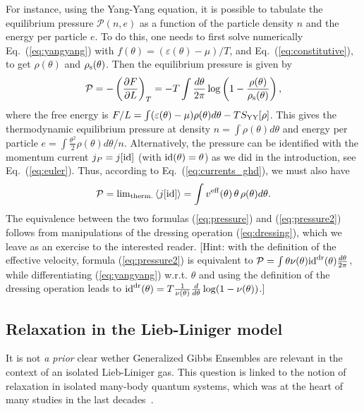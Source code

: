 \documentclass[onecolumn,amsfonts,showpacs,superscriptaddress]{revtex4-1}
\begin{document}
For instance, using the Yang-Yang equation, it is possible to tabulate the equilibrium pressure $\mathcal{P}(n,e)$ as a function of the particle density $n$ and the energy per particle $e$. To do this, one needs to first solve numerically Eq.~(\ref{eq:yangyang}) with $f(\theta) =  (\varepsilon(\theta)-\mu )/T$, and Eq.~(\ref{eq:constitutive}), to get $\rho(\theta)$ and $\rho_{\rm s}(\theta)$. Then the equilibrium pressure is given by \citep{yang1969thermodynamics,korepin1997quantum}
\begin{equation}
    \label{eq:pressure}
        \mathcal{P} = - \left( \frac{\partial F}{\partial L} \right)_T = - T \int \frac{d \theta}{2\pi} \log \left( 1 - \frac{\rho(\theta)}{\rho_{\rm s}(\theta)} \right) ,
\end{equation}
where the free energy is $F/L =  \int (\varepsilon(\theta) - \mu) \rho(\theta) d \theta - T S_{\rm YY} [\rho] $. This gives the thermodynamic equilibrium pressure at density $n = \int \rho(\theta) d\theta$ and energy per particle $e = \int \frac{\theta^2}{2} \rho(\theta) d\theta/n$. Alternatively, the pressure can be identified with the momentum current $j_P = j[{\rm id}]$ (with ${\rm id}(\theta) = \theta$) as we did in the introduction, see Eq.~(\ref{eq:euler}). Thus, according to Eq.~(\ref{eq:currents_ghd}), we must also have
\begin{equation}
    \label{eq:pressure2}
        \mathcal{P} = {\rm lim}_{\rm therm.} \left< j[{\rm id}] \right> = \int  v^{\rm eff}(\theta)  \,\theta \, \rho(\theta) d\theta .
\end{equation}
The equivalence between the two formulas (\ref{eq:pressure}) and (\ref{eq:pressure2})  follows from manipulations of the dressing operation (\ref{eq:dressing}), which we leave as an exercise to the interested reader. [Hint: with the definition of the effective velocity, formula (\ref{eq:pressure2}) is equivalent to $\mathcal{P} = \int \theta \nu(\theta) {\rm id}^{\rm dr}(\theta) \frac{d\theta}{2\pi}$, while differentiating (\ref{eq:yangyang}) w.r.t. $\theta$ and using the definition of the dressing operation leads to ${\rm id}^{\rm dr}(\theta) =  T \frac{1}{\nu(\theta)} \frac{d}{d\theta} \log(1-\nu(\theta))$.]




\subsection{Relaxation in the Lieb-Liniger model}
\label{subsec:GGE}
 It is not {\it a prior} clear wether
Generalized Gibbs Ensembles are relevant
in the context of an isolated Lieb-Liniger gas. 
This question is linked to 
the notion of relaxation in isolated many-body quantum systems, which 
was at the heart of many studies in the last decades~\citep{polkovnikov2011colloquium}.
\end{document}
